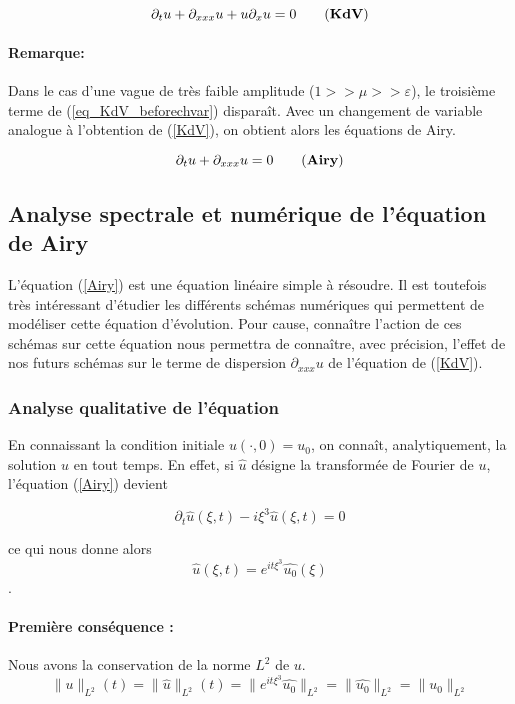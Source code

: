 \documentclass[12pt,a4paper]{article}
\numberwithin{equation}{section}
\begin{document}
\begin{equation}
    \partial_tu + \partial_{xxx}u +u\partial_xu  = 0 \label{KdV}\tag{\textbf{KdV}}
\end{equation}
\paragraph{Remarque:} Dans le cas d'une vague de très faible amplitude ($1>>\mu>>\varepsilon$), le troisième terme de (\ref{eq_KdV_beforechvar}) disparaît.  Avec un changement de variable analogue à l'obtention de (\ref{KdV}), on obtient alors les équations de Airy.

\begin{equation}
    \partial_tu + \partial_{xxx}u = 0 \label{Airy}\tag{\textbf{Airy}}
\end{equation}

\subsection{ Analyse spectrale et numérique de l'équation de Airy}
L'équation (\ref{Airy}) est une équation linéaire simple à résoudre. Il est toutefois très intéressant d'étudier les différents schémas numériques qui permettent de modéliser cette équation d'évolution. Pour cause, connaître l'action de ces schémas sur cette équation nous permettra de connaître, avec précision, l'effet de nos futurs schémas sur le terme de dispersion $\partial_{xxx}u$ de l'équation de (\ref{KdV}).
\\
\subsubsection{Analyse qualitative de l'équation}
En connaissant la condition initiale $u(\cdot,0) = u_0$, on connaît, analytiquement, la solution $u$ en tout temps. En effet, si $\hat{u}$ désigne la transformée de Fourier de $u$, l'équation (\ref{Airy}) devient

\begin{equation*}
    \partial_t\hat{u}(\xi, t) - i\xi^3\hat{u}(\xi, t) = 0
\end{equation*}

ce qui nous donne alors
\begin{equation*}
    \hat{u}(\xi, t) = e^{it\xi^3}\hat{u_0}(\xi)
\end{equation*}.

\paragraph{Première conséquence :} Nous avons la conservation de la norme $L^2$ de $u$.
\begin{equation}
    \|u\|_{L^2}(t) = \|\hat{u}\|_{L^2}(t) =\|e^{it\xi^3}\hat{u_0}\|_{L^2} =  \|\hat{u_0}\|_{L^2} =  \|u_0\|_{L^2} 
\end{equation}
\end{document}
